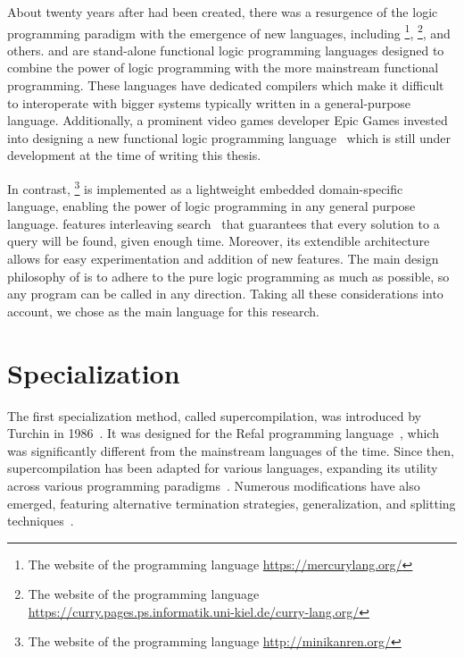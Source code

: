 \documentclass[crop=false]{standalone}
\begin{document}
About twenty years after \prolog had been created, there was a resurgence of the logic programming paradigm with the emergence of new languages, including \merc\footnote{The website of the \merc programming language \url{https://mercurylang.org/}}, \curry\footnote{The website of the \curry programming language \url{https://curry.pages.ps.informatik.uni-kiel.de/curry-lang.org/}}, and others.
\merc and \curry are stand-alone functional logic programming languages designed to combine the power of logic programming with the more mainstream functional programming. 
These languages have dedicated compilers which make it difficult to interoperate with bigger systems typically written in a general-purpose language. 
Additionally, a prominent video games developer Epic Games invested into designing a new functional logic programming language~\cite{versecalculus} which is still under development at the time of writing this thesis.

In contrast, \mk\footnote{The website of the \mk programming language \url{http://minikanren.org/}} is implemented as a lightweight embedded domain-specific language, enabling the power of logic programming in any general purpose language. 
\mk features interleaving search~\cite{kiselyov2005backtracking} that guarantees that every solution to a query will be found, given enough time. 
Moreover, its extendible architecture allows for easy experimentation and addition of new features. 
The main design philosophy of \mk is to adhere to the pure logic programming as much as possible, so any program can be called in any direction. 
Taking all these considerations into account, we chose \mk as the main language for this research. 

\section{Specialization}
  
The first specialization method, called supercompilation, was introduced by Turchin in 1986~\cite{turchin1986concept}.
It was designed for the Refal programming language~\cite{turchin1989refal}, which was significantly different from the mainstream languages of the time.
Since then, supercompilation has been adapted for various languages, expanding its utility across various programming paradigms~\cite{klyuchnikov2009supercompiler,mitchell2010rethinking}.
Numerous modifications have also emerged, featuring alternative termination strategies, generalization, and splitting techniques~\cite{leuschel2002homeomorphic,sorensen1995algorithm,turchin1988algorithm}. 
\end{document}
